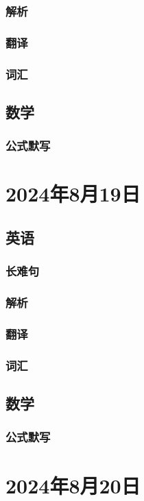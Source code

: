 \documentclass[UTF8]{ctexart}
\begin{document}
\subsubsection{解析}
\subsubsection{翻译}
\subsubsection{词汇}
\subsection{数学}
\subsubsection{公式默写}
\begin{multicols}{2}
\end{multicols}
\section{2024年8月19日}
\subsection{英语}
\subsubsection{长难句}
\subsubsection{解析}
\subsubsection{翻译}
\subsubsection{词汇}
\subsection{数学}
\subsubsection{公式默写}
\begin{multicols}{2}
\end{multicols}
\section{2024年8月20日}
\end{document}
